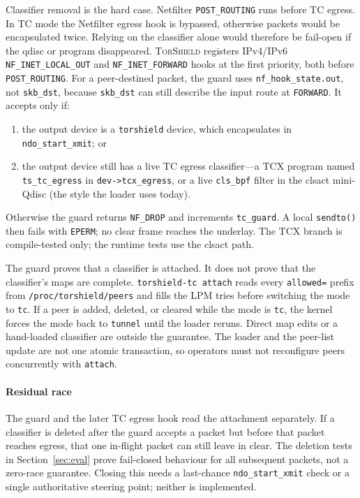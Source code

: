 \documentclass[conference]{IEEEtran}
\newcommand{\sys}{\textsc{TorShield}}
\newcommand{\code}[1]{\texttt{#1}}
\begin{document}
Classifier removal is the hard case. Netfilter \code{POST\_ROUTING} runs before TC egress. In TC mode the Netfilter egress hook is bypassed, otherwise packets would be encapsulated twice. Relying on the classifier alone would therefore be fail-open if the qdisc or program disappeared. \sys{} registers IPv4/IPv6 \code{NF\_INET\_LOCAL\_OUT} and \code{NF\_INET\_FORWARD} hooks at the first priority, both before \code{POST\_ROUTING}. For a peer-destined packet, the guard uses \code{nf\_hook\_state.out}, not \code{skb\_dst}, because \code{skb\_dst} can still describe the input route at \code{FORWARD}. It accepts only if:
\begin{enumerate}
\item the output device is a \code{torshield} device, which encapsulates in \code{ndo\_start\_xmit}; or
\item the output device still has a live TC egress classifier---a TCX program named \code{ts\_tc\_egress} in \code{dev->tcx\_egress}, or a live \code{cls\_bpf} filter in the clsact mini-Qdisc (the style the loader uses today).
\end{enumerate}
Otherwise the guard returns \code{NF\_DROP} and increments \code{tc\_guard}. A local \code{sendto()} then fails with \code{EPERM}; no clear frame reaches the underlay. The TCX branch is compile-tested only; the runtime tests use the clsact path.

The guard proves that a classifier is attached. It does not prove that the classifier's maps are complete. \code{torshield-tc attach} reads every \code{allowed=} prefix from \code{/proc/torshield/peers} and fills the LPM tries before switching the mode to \code{tc}. If a peer is added, deleted, or cleared while the mode is \code{tc}, the kernel forces the mode back to \code{tunnel} until the loader reruns. Direct map edits or a hand-loaded classifier are outside the guarantee. The loader and the peer-list update are not one atomic transaction, so operators must not reconfigure peers concurrently with \code{attach}.

\paragraph{Residual race}
The guard and the later TC egress hook read the attachment separately. If a classifier is deleted after the guard accepts a packet but before that packet reaches egress, that one in-flight packet can still leave in clear. The deletion tests in Section~\ref{sec:eval} prove fail-closed behaviour for all subsequent packets, not a zero-race guarantee. Closing this needs a last-chance \code{ndo\_start\_xmit} check or a single authoritative steering point; neither is implemented.
\end{document}
